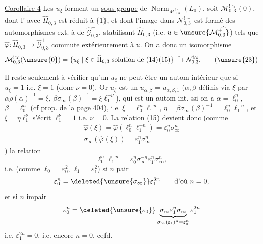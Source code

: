 \uline{Corollaire 4} Les $u_\xi$  forment un \uline{sous-groupe} de $\operatorname{Norm}_{\mathcal M_{0,3}^{!\sim}}(L_0)$, soit $\mathcal M_{0,3}^{!\approx}(0)$, dont l' avec $\widehat\Pi_{0,3}$ est réduit à $\{1\}$, et dont l'image dans $\mathcal N_{0,3}^{!\sim}$ est  formé des automorphismes ext. à  de $\widehat{\mathcal G}_{0,3}^{+}$, stabilisant $\widehat\Pi_{0,3}$ (i.e. $u\in\unsure{\mathcal M_{0,3}^{+\widehat{\ }}}$) tels que $\widehat\varphi:\widehat\Pi_{0,3}\to\widehat{\mathcal G}_{0,3}^{+}$ commute extérieurement à $u$. On a donc un isomorphisme
\[
\mathcal M_{0,3}^{!\approx}(\unsure{0})
=\{u_\xi\mid \xi\in\widehat\Pi_{0,3}\text{ solution de }(14)(15)\}
\xrightarrow{\sim}\mathcal N_{0,3}^{!\approx}.
\tag{\unsure{23}}
\]


Il reste seulement à vérifier qu'un $u_\xi$ ne peut être un autom intérieur que si $u_\xi=1$ i.e. $\xi=1$ (donc $\nu=0$). Or $u_\xi$ est un $u_{\alpha,\beta}=u_{\alpha,\beta,1}$ ($\alpha,\beta$ définis  via $\xi$ par $\alpha\rho(\alpha)^{-1}=\xi$, $\beta\sigma_\infty(\beta)^{-1}=\xi \ell_1^{-\nu}$), qui est un autom int. ssi on a $\alpha=\ell_0^n$, $\beta=\ell_0^n$ (cf prop. de la page 404), i.e. $\xi=\ell_0^n \ell_1^{-n}$, $\eta=\beta\sigma_\infty(\beta)^{-1}=\ell_0^n \ell_1^{-n}$, et   $\xi=\eta \ell_1^\nu$ s'écrit $\ell_1^\nu=1$ i.e. $\nu=0$. La relation (15) devient donc (comme
\[
\begin{gathered}
\widehat\varphi(\xi)=\widehat\varphi(\ell_0^n \ell_1^{-n})=\varepsilon_0^n\sigma_\infty^n\\
\sigma_\infty(\widehat\varphi(\xi))=\varepsilon_1^n\sigma_\infty^n
\end{gathered}
\]
)  la relation
\[
\ell_0^n \ell_1^{-n}=\varepsilon_0^n\sigma_\infty^{-n}\varepsilon_1^n\sigma_\infty^n,
\]
i.e. (comme $\ell_0=\varepsilon_0^2$, $\ell_1=\varepsilon_1^2$) si $n$ pair
\[
\varepsilon_0^n=\deleted{\unsure{\sigma_\infty}}\varepsilon_1^{3n}
\qquad\text{d'où }n=0,
\]
et si $n$ impair
\[
\varepsilon_0^n=\deleted{\unsure{\varepsilon_0}}\underbrace{\sigma_\infty\varepsilon_1^n\sigma_\infty}_{\sigma_\infty(\varepsilon_1)^n=\varepsilon_0^n}\varepsilon_1^{2n}
\]
i.e. $\varepsilon_1^{2n}=0$, i.e. encore $n=0$, cqfd.


